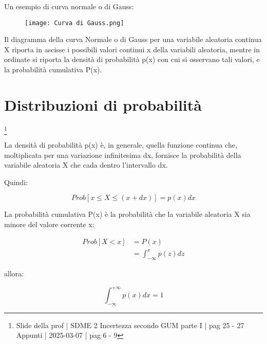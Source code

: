 Un esempio di curva normale o di Gauss: 

\begin{figure}[h]
    \centering
    \texttt{[image: Curva di Gauss.png]}
\end{figure}

Il diagramma della curva Normale o di Gauss per una variabile aleatoria continua X 
riporta in ascisse i possibili valori continui x della variabili aleatoria, 
mentre in ordinate si riporta la densità di probabilità p(x) con cui si osservano tali valori, 
e la probabilità cumulativa P(x). \newline 

\newpage

\section{Distribuzioni di probabilità}
\footnote{Slide della prof | SDME 2 Incertezza secondo GUM parte I | pag 25 - 27 \\  
Appunti | 2025-03-07 | pag 6 - 9}

La densità di probabilità p(x) è, in generale, quella funzione continua che, 
moltiplicata per una variazione infinitesima dx, fornisce la probabilità della variabile aleatoria X 
che cada dentro l'intervallo dx. \newline 

Quindi: 

{ 
    \Large 
    \begin{equation}
        Prob[x \leq X \leq (x + dx)]
        = 
        p(x) dx
    \end{equation}
}

La probabilità cumulativa P(x) è la probabilità che la variabile aleatoria X sia minore del valore corrente x: 

{
    \Large 
    \begin{equation}
        \begin{split}
            Prob [X < x]
            &= 
            P(x) 
            \\ 
            &= 
            \int_{- \infty}^{x}
            p(z) 
            dz 
        \end{split}
    \end{equation}
}

allora: 

{
    \Large 
    \begin{equation}
        \int_{- \infty}^{+ \infty} 
        p(x) dx 
        =
        1 
    \end{equation}
}

